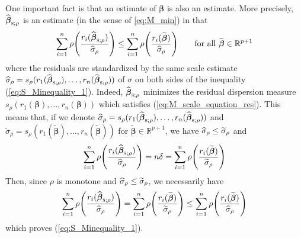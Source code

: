 One important fact is that an  estimate of $\boldsymbol\beta$ is also an
 estimate. More precisely, $\sthat{\boldsymbol\beta}_{\stsc{S};\rho}$
is an  estimate (in the sense of \ref{eq:M_min}) in that
%
\begin{equation}\label{eq:S_Minequality_1}
    \sum_{i=1}^{n}\rho\left(\frac{r_{i}(\sthat{\boldsymbol\beta}_{\stsc{S};\rho})}{\sthat{\sigma}_{\rho}}\right) 
    \leq \sum_{i=1}^{n}\rho\left(\frac{r_{i}(\widetilde{\boldsymbol\beta})}{\sthat{\sigma}_{\rho}}\right)
    \qquad
    \text{for all $\widetilde{\boldsymbol\beta} \in \mathbb{R}^{p+1}$}
\end{equation}
%
where the residuals are standardized by the same scale  estimate
$\sthat{\sigma}_{\rho} =
s_{\rho}(r_{1}(\sthat{\boldsymbol\beta}_{\stsc{S};\rho}),\allowbreak
\dots,\allowbreak r_{n}(\sthat{\boldsymbol\beta}_{\stsc{S};\rho}))$ of $\sigma$
on both sides of the inequality (\ref{eq:S_Minequality_1}). Indeed,
$\sthat{\boldsymbol\beta}_{\stsc{S};\rho}$ minimizes the residual dispersion
measure $s_{\rho}(r_{1}(\boldsymbol\beta), \dots, r_{n}(\boldsymbol\beta))$
which satisfies (\ref{eq:M_scale_equation_res}). This means that, if we denote
$\sthat{\sigma}_{\rho} =
s_{\rho}(r_{1}(\sthat{\boldsymbol\beta}_{\stsc{S};\rho}), \dots,
r_{n}(\sthat{\boldsymbol\beta}_{\stsc{S};\rho}))$ and
$\widetilde{\sigma}_{\rho} = s_{\rho}(r_{1}(\widetilde{\boldsymbol\beta}),
\dots, r_{n}(\widetilde{\boldsymbol\beta}))$ for $\widetilde{\boldsymbol\beta}
\in \mathbb{R}^{p+1}$, we have $\widehat{\sigma}_{\rho} \leq
\widetilde{\sigma}_{\rho}$ and
\[
    \sum_{i=1}^{n} \rho\left(\frac{r_{i}(\sthat{\boldsymbol\beta}_{\stsc{S};\rho})}{\sthat{\sigma}_{\rho}}\right) 
    = n\delta
    = \sum_{i=1}^{n}\rho\left(\frac{r_{i}(\widetilde{\boldsymbol\beta})}{\widetilde{\sigma}_{\rho}}\right)
\]
Then, since $\rho$ is monotone and $\widehat{\sigma}_{\rho} \leq
\widetilde{\sigma}_{\rho}$, we necessarily have
\[
    \sum_{i=1}^{n} \rho\left(\frac{r_{i}(\sthat{\boldsymbol\beta}_{\stsc{S};\rho})}{\sthat{\sigma}_{\rho}}\right)
    = \sum_{i=1}^{n} \rho\left(\frac{r_{i}(\widetilde{\boldsymbol\beta})}{\widetilde{\sigma}_{\rho}}\right)
    \leq \sum_{i=1}^{n}\rho\left(\frac{r_{i}(\widetilde{\boldsymbol\beta})}{\sthat{\sigma}_{\rho}}\right)
\]
which proves (\ref{eq:S_Minequality_1}).

